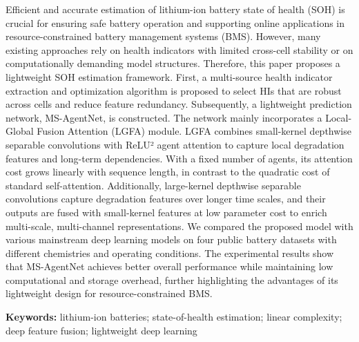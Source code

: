 Efficient and accurate estimation of lithium-ion battery state of health (SOH) is crucial for ensuring safe battery operation and supporting online applications in resource-constrained battery management systems (BMS). However, many existing approaches rely on health indicators with limited cross-cell stability or on computationally demanding model structures. Therefore, this paper proposes a lightweight SOH estimation framework. First, a multi-source health indicator extraction and optimization algorithm is proposed to select HIs that are robust across cells and reduce feature redundancy. Subsequently, a lightweight prediction network, MS-AgentNet, is constructed. The network mainly incorporates a Local-Global Fusion Attention (LGFA) module. LGFA combines small-kernel depthwise separable convolutions with ReLU² agent attention to capture local degradation features and long-term dependencies. With a fixed number of agents, its attention cost grows linearly with sequence length, in contrast to the quadratic cost of standard self-attention. Additionally, large-kernel depthwise separable convolutions capture degradation features over longer time scales, and their outputs are fused with small-kernel features at low parameter cost to enrich multi-scale, multi-channel representations. We compared the proposed model with various mainstream deep learning models on four public battery datasets with different chemistries and operating conditions. The experimental results show that MS-AgentNet achieves better overall performance while maintaining low computational and storage overhead, further highlighting the advantages of its lightweight design for resource-constrained BMS.

\textbf{Keywords:} lithium-ion batteries; state-of-health estimation; linear complexity; deep feature fusion; lightweight deep learning

